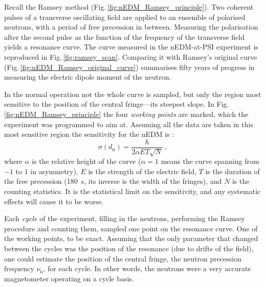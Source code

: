 Recall the Ramsey method (Fig.\,\ref{fig:nEDM_Ramsey_principle}). Two coherent pulses of a transverse oscillating field are applied to an ensemble of polarised neutrons, with a period of free precession in between. Measuring the polarisation after the second pulse as the function of the frequency of the transverse field yields a resonance curve. The curve measured in the nEDM-at-PSI experiment is reproduced in Fig.\,\ref{fig:ramsey_scan}. Comparing it with Ramsey's original curve (Fig.\,\ref{fig:nEDM_Ramsey_original_curve}) summarises fifty years of progress in measuring the electric dipole moment of the neutron.

In the normal operation not the whole curve is sampled, but only the region most sensitive to the position of the central fringe---its steepest slope. In Fig.\,\ref{fig:nEDM_Ramsey_principle} the four \emph{working points} are marked, which the experiment was programmed to aim at. Assuming all the data are taken in this most sensitive region the sensitivity for the nEDM is :
\begin{equation}
  \sigma(d_\text{n}) = \frac{\hbar}{ 2 \alpha E T \sqrt{N} } \ ,
\end{equation}
where $\alpha$ is the relative height of the curve ($\alpha = 1$ means the curve spanning from $-1$ to $1$ in asymmetry), $E$ is the strength of the electric field, $T$ is the duration of the free precession (\SI{180}{\second}, its inverse is the width of the fringes), and $N$ is the counting statistics. It is the statistical limit on the sensitivity, and any systematic effects will cause it to be worse. 

Each \emph{cycle} of the experiment, filling in the neutrons, performing the Ramsey procedure and counting them, sampled one point on the resonance curve. One of the working points, to be exact. Assuming that the only parameter that changed between the cycles was the position of the resonance (due to drifts of the field), one could estimate the position of the central fringe, the neutron precession frequency $\nu_\text{n}$, for each cycle. In other words, the neutrons were a very accurate magnetometer operating on a cycle basis.

